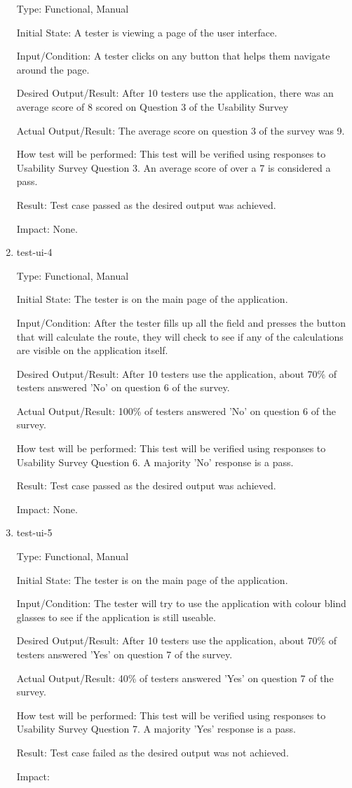 \documentclass[12pt, titlepage]{article}
\begin{document}
\begin{enumerate}
Type: Functional, Manual

Initial State: A tester is viewing a page of the user interface.

Input/Condition: A tester clicks on any button that helps them navigate around the page. 

Desired Output/Result: After 10 testers use the application,  there was an average score of 8 scored on Question 3 of the Usability Survey

Actual Output/Result: The average score on question 3 of the survey was 9.

How test will be performed: This test will be verified using responses to Usability Survey Question 3. An average score of over a 7 is considered a pass.

Result: Test case passed as the desired output was achieved.

Impact: None.

\item{test-ui-4\\}

Type: Functional, Manual

Initial State: The tester is on the main page of the application.

Input/Condition: After the tester fills up all the field and presses the button that will calculate the route, they will check to see if any of the calculations are visible on the application itself.

Desired Output/Result: After 10 testers use the application, about 70\% of testers answered 'No' on question 6 of the survey.

Actual Output/Result: 100\% of testers answered 'No' on question 6 of the survey.

How test will be performed: This test will be verified using responses to Usability Survey Question 6. A majority 'No' response is a pass.

Result: Test case passed as the desired output was achieved.

Impact: None.

\item{test-ui-5\\}

Type: Functional, Manual

Initial State: The tester is on the main page of the application.

Input/Condition: The tester will try to use the application with colour blind glasses to see if the application is still useable.

Desired Output/Result: After 10 testers use the application, about 70\% of testers answered 'Yes' on question 7 of the survey.

Actual Output/Result: 40\% of testers answered 'Yes' on question 7 of the survey.

How test will be performed: This test will be verified using responses to Usability Survey Question 7. A majority 'Yes' response is a pass.

Result: Test case failed as the desired output was not achieved.

Impact: 

\end{enumerate}
\end{document}
